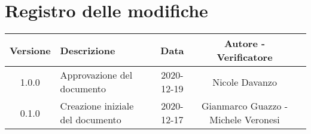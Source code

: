 \section*{Registro delle modifiche}

\begin{center}
	\begin{longtable}{|c|p{5cm}|c|c|c|}
	\hline
	\rowcolor{lighter-grayer}
	\textbf{Versione} & \textbf{Descrizione} & \textbf{Data} & \textbf{Autore - Verificatore} \\
	\hline
	\endfirsthead


	\hline
	1.0.0 & Approvazione del documento & 2020-12-19 & Nicole Davanzo\\
	0.1.0 & Creazione iniziale del documento & 2020-12-17 & Gianmarco Guazzo - Michele Veronesi \\
	\hline

	\end{longtable}
\end{center}
